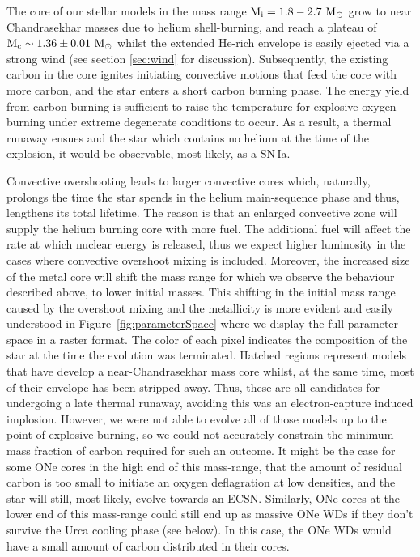 \documentclass[../../main/thesis_msc.tex]{subfiles}
\begin{document}
    
    The core of our stellar models in the mass range $\rm M_i = 1.8 - 2.7 \ M_{\odot}$ grow to near Chandrasekhar masses due to helium shell-burning, and reach a plateau of $\rm M_c \sim 1.36 \pm 0.01 \ M_{\odot}$ whilst the extended He-rich envelope is easily ejected via a strong wind (see section \ref{sec:wind} for discussion).
    Subsequently, the existing carbon in the core ignites initiating convective motions that feed the core with more carbon, and the star enters a short carbon burning phase. The energy yield from carbon burning is sufficient to raise the temperature for explosive oxygen burning under extreme degenerate conditions to occur. As a result, a thermal runaway ensues and the star which contains no helium at the time of the explosion, it would be observable, most likely, as a SN\,Ia.
    
    Convective overshooting leads to larger convective cores which, naturally, prolongs the time the star spends in the helium main-sequence phase and thus, lengthens its total lifetime. The reason is that an enlarged convective zone will supply the helium burning core with more fuel. The additional fuel will affect the rate at which nuclear energy is released, thus we expect higher luminosity in the cases where convective overshoot mixing is included. Moreover, the increased size of the metal core will shift the mass range for which we observe the behaviour described above, to lower initial masses. This shifting in the initial mass range caused by the overshoot mixing and the metallicity is more evident and easily understood in Figure\, \ref{fig:parameterSpace} where we display the full parameter space in a raster format. The color of each pixel indicates the composition of the star at the time the evolution was terminated. Hatched regions represent models that have develop a near-Chandrasekhar mass core whilst, at the same time, most of their envelope has been stripped away. Thus, these are all candidates for undergoing a late thermal runaway, avoiding this was an electron-capture induced implosion. However, we were not able to evolve all of those models up to the point of explosive burning, so we could not accurately constrain the minimum mass fraction of carbon required for such an outcome. It might be the case for some ONe cores in the high end of this mass-range, that the amount of residual carbon is too small to initiate an oxygen deflagration at low densities, and the star will still, most likely, evolve towards an ECSN. Similarly, ONe cores at the lower end of this mass-range could still end up as massive ONe WDs if they don't survive the Urca cooling phase (see below). In this case, the ONe WDs would have a small amount of carbon distributed in their cores.
    
\end{document}
